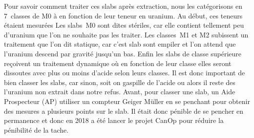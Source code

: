 Pour savoir comment traiter ces slabs  après extraction, nous les catégorisons en 7~classes de M0 à  en fonction de leur teneur en uranium. Au début, ces teneurs étaient mesurées  Les slabs~M0 sont dites stériles, car elle contient tellement peu d'uranium que l'on ne souhaite pas les traiter. Les classes~M1 et M2 subissent un traitement que l'on dit statique, car c'est slab sont empiler et l’on attend que l'uranium descend par gravité jusqu'un bas. Enfin les slabs de classe supérieure reçoivent un traitement dynamique où en fonction de leur classe elles seront dissoutes avec plus ou moins d'acide selon leurs classes. Il est donc important de bien classer les slabs, car sinon, soit on gaspille  de l'acide ou alors il reste des l'uranium non extrait dans notre refus.
Avant, pour classer une slab, un Aide Prospecteur (AP) utiliser un compteur Geiger Müller en se penchant pour obtenir des mesures a plusieurs points sur le slab. Il était donc pénible de se pencher en permanence et donc en 2018 a été lancer le projet CanOp pour réduire la pénibilité de la tache.
